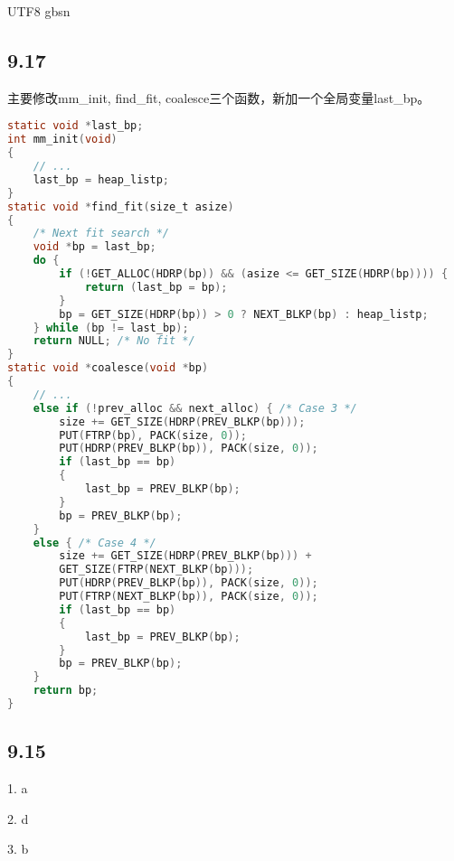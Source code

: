\documentclass {article}
\begin{document}
\begin {CJK*} {UTF8} {gbsn}
			\subsection{9.17}
				主要修改mm\_init, find\_fit, coalesce三个函数，新加一个全局变量last\_bp。
				
				\begin{lstlisting}[language=C]
static void *last_bp;
int mm_init(void)
{
	// ...
	last_bp = heap_listp;
}
static void *find_fit(size_t asize)
{
	/* Next fit search */
	void *bp = last_bp;
	do {
		if (!GET_ALLOC(HDRP(bp)) && (asize <= GET_SIZE(HDRP(bp)))) {
			return (last_bp = bp);
		}
		bp = GET_SIZE(HDRP(bp)) > 0 ? NEXT_BLKP(bp) : heap_listp;
	} while (bp != last_bp);
	return NULL; /* No fit */
}
static void *coalesce(void *bp)
{
	// ...
	else if (!prev_alloc && next_alloc) { /* Case 3 */
		size += GET_SIZE(HDRP(PREV_BLKP(bp)));
		PUT(FTRP(bp), PACK(size, 0));
		PUT(HDRP(PREV_BLKP(bp)), PACK(size, 0));
		if (last_bp == bp)
		{
			last_bp = PREV_BLKP(bp);
		}
		bp = PREV_BLKP(bp);
	}
	else { /* Case 4 */
		size += GET_SIZE(HDRP(PREV_BLKP(bp))) +
		GET_SIZE(FTRP(NEXT_BLKP(bp)));
		PUT(HDRP(PREV_BLKP(bp)), PACK(size, 0));
		PUT(FTRP(NEXT_BLKP(bp)), PACK(size, 0));
		if (last_bp == bp)
		{
			last_bp = PREV_BLKP(bp);
		}
		bp = PREV_BLKP(bp);
	}
	return bp;
}
				\end{lstlisting}
				
			\subsection{9.15}
				1. a
				
				2. d
				
				3. b

  \end {CJK*}
\end{document}

